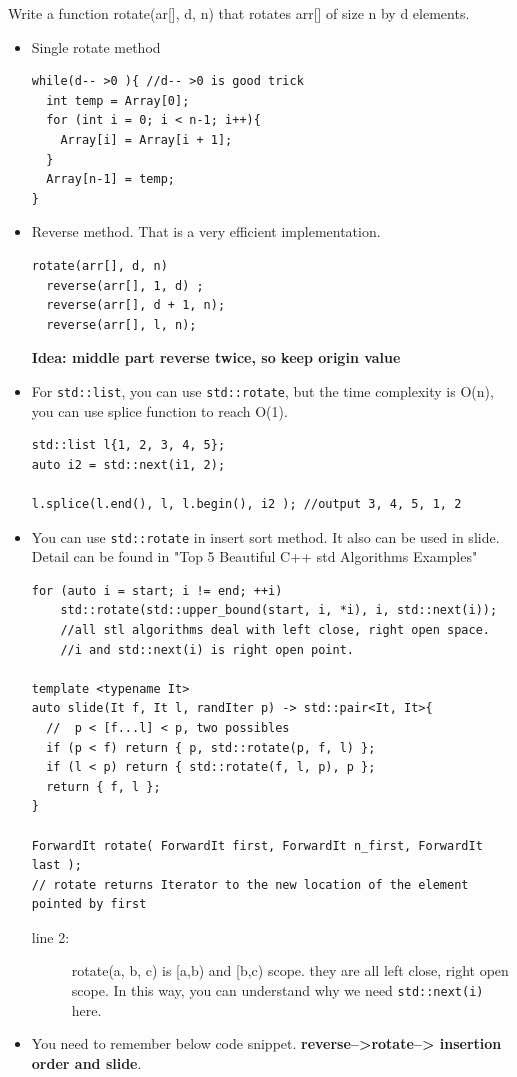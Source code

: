\documentclass[a4paper,11pt,twoside]{book}
\begin{document}
	\par  Write a function rotate(ar[], d, n) that rotates arr[] of size n by d elements.
\begin{itemize}
	
	\item Single rotate method
\begin{lstlisting}[breaklines]
while(d-- >0 ){ //d-- >0 is good trick
  int temp = Array[0];
  for (int i = 0; i < n-1; i++){
    Array[i] = Array[i + 1];
  }
  Array[n-1] = temp;
}
\end{lstlisting}

	\item Reverse method. That is a very efficient implementation.
\begin{lstlisting}[breaklines]
rotate(arr[], d, n)
  reverse(arr[], 1, d) ;
  reverse(arr[], d + 1, n);
  reverse(arr[], l, n);
\end{lstlisting}
\textbf{Idea: middle part reverse twice, so keep origin value}

	\item For \texttt{std::list}, you can use \texttt{std::rotate}, but the time complexity is O(n), you can use splice function to reach O(1).  
\begin{lstlisting}
std::list l{1, 2, 3, 4, 5};
auto i2 = std::next(i1, 2);

l.splice(l.end(), l, l.begin(), i2 ); //output 3, 4, 5, 1, 2
\end{lstlisting}


	\item You can use \texttt{std::rotate} in insert sort method. It also can be used in slide. Detail can be found in "Top 5 Beautiful C++ std Algorithms Examples"
\begin{lstlisting}[breaklines, basicstyle=\scriptsize]
for (auto i = start; i != end; ++i)
	std::rotate(std::upper_bound(start, i, *i), i, std::next(i));  
	//all stl algorithms deal with left close, right open space. 
	//i and std::next(i) is right open point.

template <typename It> 
auto slide(It f, It l, randIter p) -> std::pair<It, It>{
  //  p < [f...l] < p, two possibles 
  if (p < f) return { p, std::rotate(p, f, l) };
  if (l < p) return { std::rotate(f, l, p), p };
  return { f, l };
}

ForwardIt rotate( ForwardIt first, ForwardIt n_first, ForwardIt last );
// rotate returns Iterator to the new location of the element pointed by first
\end{lstlisting}
\begin{description}
	\item[line 2:] rotate(a, b, c) is [a,b) and [b,c) scope. they are all left close, right open scope. In this way, you can understand why we need \texttt{std::next(i)} here.
\end{description}

	\item You need to remember below code snippet. \textbf{reverse-->rotate--> insertion order and slide}. 

\end{itemize}
\end{document}
